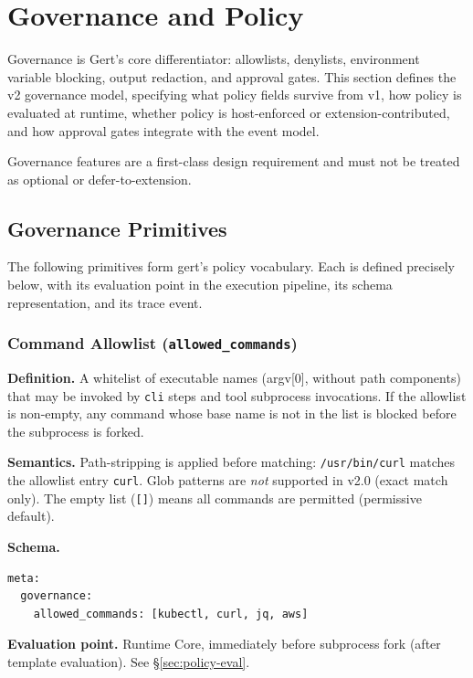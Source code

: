 \chapter{Governance and Policy}

Governance is Gert's core differentiator: allowlists, denylists, environment variable blocking,
output redaction, and approval gates. This section defines the v2 governance model, specifying
what policy fields survive from v1, how policy is evaluated at runtime, whether policy is
host-enforced or extension-contributed, and how approval gates integrate with the event model.

Governance features are a first-class design requirement and must not be treated as optional
or defer-to-extension.

\section{Governance Primitives}

The following primitives form gert's policy vocabulary. Each is defined precisely below, with
its evaluation point in the execution pipeline, its schema representation, and its trace event.

\subsection{Command Allowlist (\texttt{allowed\_commands})}

\textbf{Definition.} A whitelist of executable names (argv[0], without path components) that
may be invoked by \texttt{cli} steps and tool subprocess invocations. If the allowlist is
non-empty, any command whose base name is not in the list is blocked before the subprocess is
forked.

\textbf{Semantics.} Path-stripping is applied before matching: \texttt{/usr/bin/curl} matches
the allowlist entry \texttt{curl}. Glob patterns are \emph{not} supported in v2.0 (exact match
only). The empty list (\texttt{[]}) means all commands are permitted (permissive default).

\textbf{Schema.}
\begin{verbatim}
meta:
  governance:
    allowed_commands: [kubectl, curl, jq, aws]
\end{verbatim}

\textbf{Evaluation point.} Runtime Core, immediately before subprocess fork (after template
evaluation). See §\ref{sec:policy-eval}.

